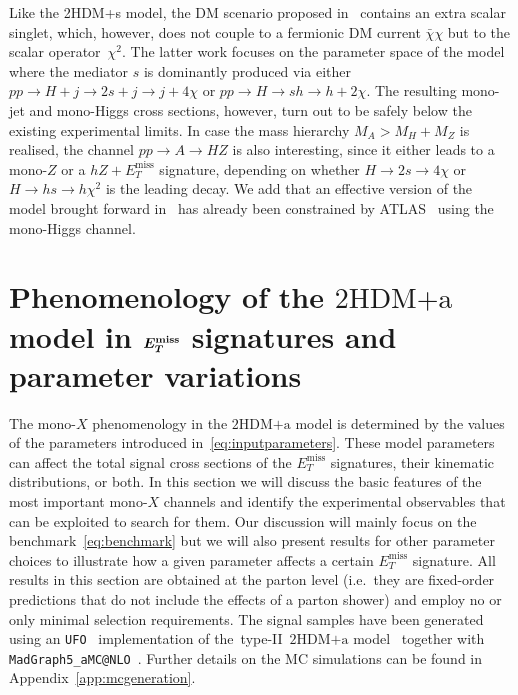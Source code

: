 \documentclass[a4paper, 11pt,notoc]{article}
\newcommand{\MET}{\ensuremath{E_T^\mathrm{miss}}\xspace}
\newcommand{\hdma}{\ensuremath{\textrm{2HDM+a}}\xspace}
\def\bm#1{\mbox{\boldmath$#1$\unboldmath}}
\begin{document}
 Like the 2HDM+s model, the DM scenario proposed in~\cite{vonBuddenbrock:2016rmr} contains an extra scalar singlet, which, however, does not couple to a fermionic DM current $\bar \chi \chi$ but to the scalar operator~$\chi^2$. The latter work focuses on the parameter space of the model where the mediator $s$ is dominantly produced via either  $pp \to H + j \to 2s + j \to j + 4 \chi$ or $pp \to H \to sh \to h + 2\chi$. The resulting mono-jet and mono-Higgs cross sections, however, turn out to be safely below the existing experimental limits. In case the mass hierarchy  $M_A > M_H + M_Z$ is realised, the channel $pp \to A \to HZ$ is also interesting, since it either leads to a mono-$Z$ or a $hZ+\MET$ signature, depending on whether $H \to 2 s \to 4 \chi$ or $H \to h s \to h \chi^2$ is the leading decay. We add that an effective version of the model brought forward in~\cite{vonBuddenbrock:2016rmr}  has already been constrained by ATLAS~\cite{Aaboud:2017uak} using the mono-Higgs channel.  


\section{Phenomenology of the \hdma model in $\bm{E_T^{\rm miss}}$ signatures and parameter variations}
\label{sec:experimentbasics}

The mono-$X$ phenomenology in the  \hdma model is determined by the values of the parameters introduced in~\eqref{eq:inputparameters}. These model parameters can affect the total signal cross sections of the $\MET$ signatures, their kinematic distributions, or both. In this section we will discuss the basic features of the most important mono-$X$ channels and identify the experimental observables that can be exploited to search for them. Our discussion will  mainly focus on the benchmark~\eqref{eq:benchmark} but we will also present results for other parameter choices to illustrate how a given parameter affects a certain $\MET$ signature.  All results in this section are obtained at the parton level (i.e.~they are fixed-order predictions that do not include the effects of a parton shower) and employ no or only minimal selection requirements. The signal samples have been generated using an {\tt UFO}~\cite{Degrande:2011ua} implementation of the~type-II~\hdma model~\cite{hdmaUFO} together with {\tt MadGraph5\_aMC@NLO}~\cite{Alwall:2014hca}. Further details on the MC simulations can be found in Appendix~\ref{app:mcgeneration}.
\end{document}
